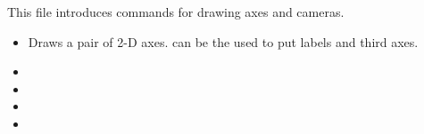 This file introduces commands for drawing axes and cameras.

\begin{itemize}
\item {} Draws a pair of 2-D axes.  can be the used to put labels and third axes.
\item {}
\item {}
\item {}
\item {}
\end{itemize}

